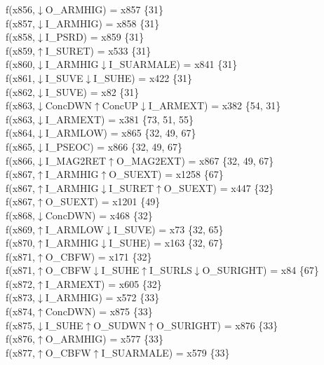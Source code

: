 f(x856,$\downarrow$O\_ARMHIG) = x857 \{31\} \\  
f(x857,$\downarrow$I\_ARMHIG) = x858 \{31\} \\  
f(x858,$\downarrow$I\_PSRD) = x859 \{31\} \\  
f(x859,$\uparrow$I\_SURET) = x533 \{31\} \\  
f(x860,$\downarrow$I\_ARMHIG$\downarrow$I\_SUARMALE) = x841 \{31\} \\  
f(x861,$\downarrow$I\_SUVE$\downarrow$I\_SUHE) = x422 \{31\} \\  
f(x862,$\downarrow$I\_SUVE) = x82 \{31\} \\  
f(x863,$\downarrow$ConcDWN$\uparrow$ConcUP$\downarrow$I\_ARMEXT) = x382 \{54, 31\} \\  
f(x863,$\downarrow$I\_ARMEXT) = x381 \{73, 51, 55\} \\  
f(x864,$\downarrow$I\_ARMLOW) = x865 \{32, 49, 67\} \\  
f(x865,$\downarrow$I\_PSEOC) = x866 \{32, 49, 67\} \\  
f(x866,$\downarrow$I\_MAG2RET$\uparrow$O\_MAG2EXT) = x867 \{32, 49, 67\} \\  
f(x867,$\uparrow$I\_ARMHIG$\uparrow$O\_SUEXT) = x1258 \{67\} \\  
f(x867,$\uparrow$I\_ARMHIG$\downarrow$I\_SURET$\uparrow$O\_SUEXT) = x447 \{32\} \\  
f(x867,$\uparrow$O\_SUEXT) = x1201 \{49\} \\  
f(x868,$\downarrow$ConcDWN) = x468 \{32\} \\  
f(x869,$\uparrow$I\_ARMLOW$\downarrow$I\_SUVE) = x73 \{32, 65\} \\  
f(x870,$\uparrow$I\_ARMHIG$\downarrow$I\_SUHE) = x163 \{32, 67\} \\  
f(x871,$\uparrow$O\_CBFW) = x171 \{32\} \\  
f(x871,$\uparrow$O\_CBFW$\downarrow$I\_SUHE$\uparrow$I\_SURLS$\downarrow$O\_SURIGHT) = x84 \{67\} \\  
f(x872,$\uparrow$I\_ARMEXT) = x605 \{32\} \\  
f(x873,$\downarrow$I\_ARMHIG) = x572 \{33\} \\  
f(x874,$\uparrow$ConcDWN) = x875 \{33\} \\  
f(x875,$\downarrow$I\_SUHE$\uparrow$O\_SUDWN$\uparrow$O\_SURIGHT) = x876 \{33\} \\  
f(x876,$\uparrow$O\_ARMHIG) = x577 \{33\} \\  
f(x877,$\uparrow$O\_CBFW$\uparrow$I\_SUARMALE) = x579 \{33\} \\  
